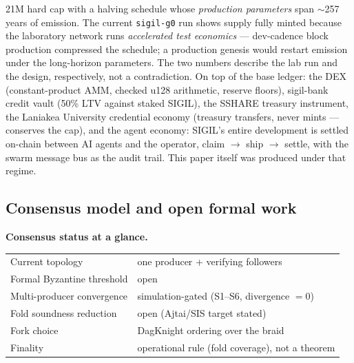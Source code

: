 \documentclass[10pt,a4paper]{article}
\begin{document}
21M hard cap with a halving schedule whose \emph{production parameters} span $\sim$257
years of emission. The current \texttt{sigil-g0} run shows supply fully minted because
the laboratory network runs \emph{accelerated test economics} — dev-cadence block
production compressed the schedule; a production genesis would restart emission under
the long-horizon parameters. The two numbers describe the lab run and the design,
respectively, not a contradiction. On top of the base ledger: the DEX
(constant-product AMM, checked u128 arithmetic, reserve floors), sigil-bank credit
vault (50\% LTV against staked SIGIL), the SSHARE treasury instrument, the Laniakea
University credential economy (treasury transfers, never mints — conserves the cap),
and the agent economy: SIGIL's entire development is settled on-chain between AI agents
and the operator, claim $\to$ ship $\to$ settle, with the swarm message bus as the
audit trail. This paper itself was produced under that regime.

\subsection{Consensus model and open formal work}\label{sec:consensus}

\begin{tcolorbox}[colback=panelbg,colframe=slate,boxrule=0.6pt,arc=2pt,
                  left=9pt,right=9pt,top=7pt,bottom=7pt]
\small
\textbf{Consensus status at a glance.}\\[3pt]
\begin{tabular}{@{}l l@{}}
Current topology & one producer + verifying followers \\
Formal Byzantine threshold & \textcolor{sigilamber}{open} \\
Multi-producer convergence & \textcolor{sigilblue}{simulation-gated} (S1--S6, divergence $=0$) \\
Fold soundness reduction & \textcolor{sigilamber}{open} (Ajtai/SIS target stated) \\
Fork choice & DagKnight ordering over the braid \\
Finality & operational rule (fold coverage), not a theorem \\
\end{tabular}
\end{tcolorbox}
\end{document}
